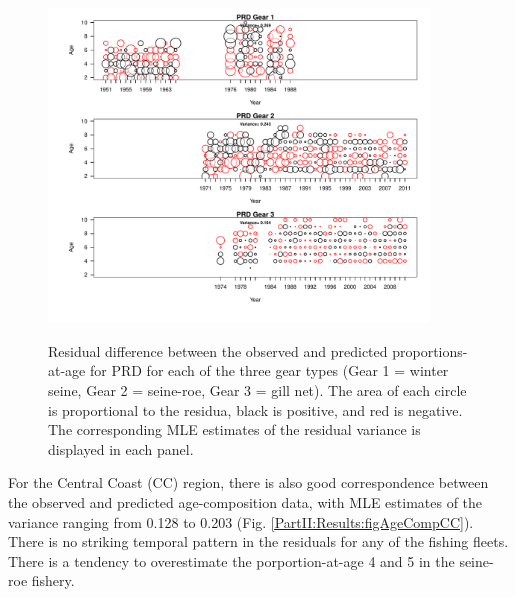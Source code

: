 \begin{figure}
	\centering
	\includegraphics[width=0.9\textwidth]{../FIGS/qPriorFigs/iscam_fig_agecompsresid_PRD.pdf}\\
	\caption{Residual difference between the observed and predicted proportions-at-age for PRD for each of the three gear types (Gear 1 = winter seine, Gear 2 = seine-roe, Gear 3 = gill net).  The area of each circle is proportional to the residua, black is positive, and red is negative.  The corresponding MLE estimates of the residual variance is displayed in each panel.}\label{PartII:Results:figAgeCompPRD}
\end{figure}


For the Central Coast (CC) region, there is also good correspondence between the observed and predicted age-composition data, with MLE estimates of the variance ranging from 0.128 to 0.203 (Fig. \ref{PartII:Results:figAgeCompCC}).  There is no striking temporal pattern in the residuals for any of the fishing fleets.  There is a tendency to overestimate the porportion-at-age 4 and 5 in the seine-roe fishery.


